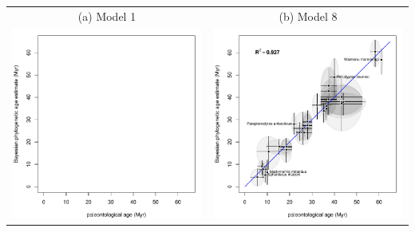 \documentclass{standalone}
\begin{document}
\begin{tabular}{cc}
(a) Model 1 & (b) Model 8 \\
\includegraphics[width=7cm]{1_penguins_eNprior/1_phyloAgeVsGeoAge.pdf} 
& 
\includegraphics[width=7cm]{penguins_8/8_phyloAgeVsGeoAge.pdf}
\\
\end{tabular}
\end{document}
